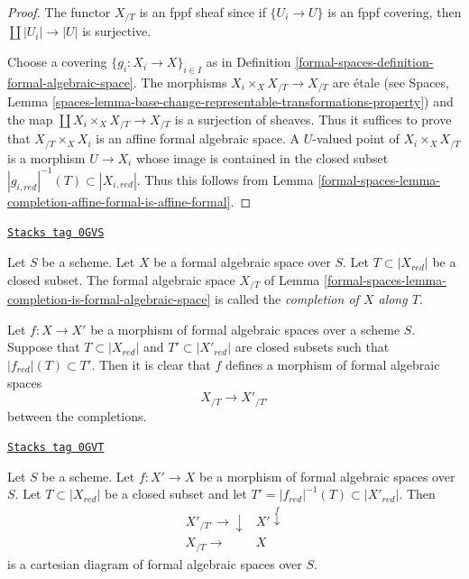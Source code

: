 \begin{proof}
The functor $X_{/T}$ is an fppf sheaf since if
$\{U_i \to U\}$ is an fppf covering, then
$\coprod |U_i| \to |U|$ is surjective.

\medskip\noindent
Choose a covering $\{g_i : X_i \to X\}_{i \in I}$ as in Definition
\ref{formal-spaces-definition-formal-algebraic-space}.
The morphisms $X_i \times_X X_{/T} \to X_{/T}$ are \'etale
(see Spaces, Lemma
\ref{spaces-lemma-base-change-representable-transformations-property})
and the map $\coprod X_i \times_X X_{/T} \to X_{/T}$ is a surjection of
sheaves. Thus it suffices to prove that $X_{/T} \times_X X_i$
is an affine formal algebraic space. A $U$-valued point of
$X_i \times_X X_{/T}$ is a morphism $U \to X_i$ whose image is
contained in the closed subset
$|g_{i, red}|^{-1}(T) \subset |X_{i, red}|$. Thus this follows from
Lemma \ref{formal-spaces-lemma-completion-affine-formal-is-affine-formal}.
\end{proof}

\begin{definition}
\label{formal-spaces-definition-completion-formal-algebraic-space}
\href{https://stacks.math.columbia.edu/tag/0GVS}{\texttt{Stacks tag 0GVS}}

Let $S$ be a scheme. Let $X$ be a formal algebraic space over $S$.
Let $T \subset |X_{red}|$ be a closed subset. The formal algebraic space
$X_{/T}$ of Lemma \ref{formal-spaces-lemma-completion-is-formal-algebraic-space}
is called the {\it completion of $X$ along $T$}.
\end{definition}

Let $f : X \to X'$ be a morphism of formal algebraic spaces over a scheme $S$.
Suppose that $T \subset |X_{red}|$ and $T' \subset |X'_{red}|$
are closed subsets such that $|f_{red}|(T) \subset T'$. Then it is clear that
$f$ defines a morphism of formal algebraic spaces
$$
X_{/T} \longrightarrow X'_{/T'}
$$
between the completions.

\begin{lemma}
\label{formal-spaces-lemma-map-recompletions}
\href{https://stacks.math.columbia.edu/tag/0GVT}{\texttt{Stacks tag 0GVT}}

Let $S$ be a scheme. Let $f : X' \to X$ be a morphism
of formal algebraic spaces over $S$. Let $T \subset |X_{red}|$
be a closed subset and let $T' = |f_{red}|^{-1}(T) \subset |X'_{red}|$.
Then
$$
\begin{array}{cc}X'_{/T'} \longrightarrow\downarrow & X' \overset{f}{\downarrow} \\ X_{/T} \longrightarrow & X\end{array}
$$
is a cartesian diagram of formal algebraic spaces over $S$.
\end{lemma}

